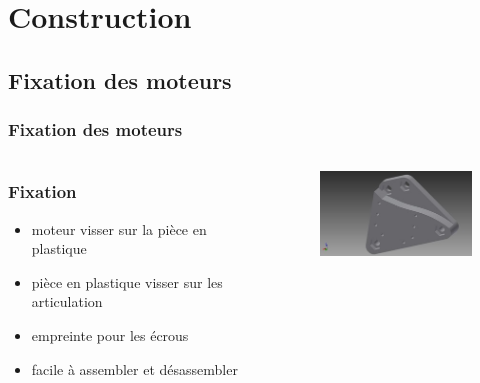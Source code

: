 \section{Construction}

\subsection{Fixation des moteurs}
\begin{frame}
  \frametitle{Fixation des moteurs}
  \begin{columns}[c]
    \begin{column}[T]{.5\textwidth}
      \frametitle{Fixation}
      \begin{itemize}
        \item moteur visser sur la pièce en plastique
        \item pièce en plastique visser sur les articulation
        \item empreinte pour les écrous
        \item facile à assembler et désassembler
      \end{itemize}
    \end{column}
    \begin{column}[T]{.5\textwidth}  
      \begin{figure}
        			\includegraphics[width=5cm]{../img/part_middle_v1.jpg}
      \end{figure}
    \end{column}
  \end{columns}
\end{frame}

